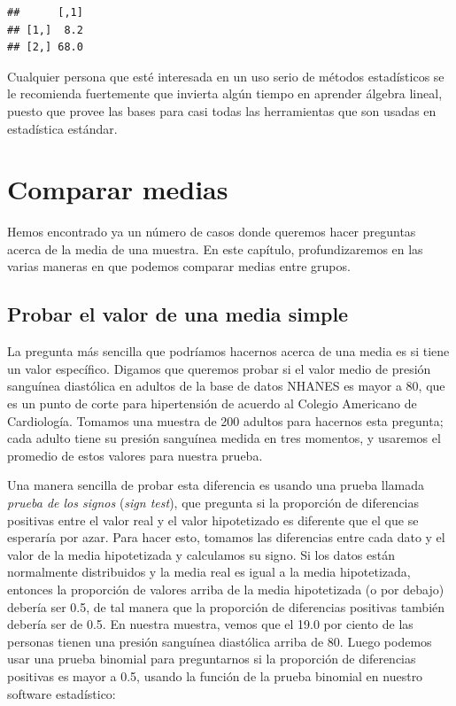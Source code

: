 \documentclass[
  12pt,
]{book}
\begin{document}
\begin{verbatim}
##      [,1]
## [1,]  8.2
## [2,] 68.0
\end{verbatim}

Cualquier persona que esté interesada en un uso serio de métodos estadísticos se le recomienda fuertemente que invierta algún tiempo en aprender álgebra lineal, puesto que provee las bases para casi todas las herramientas que son usadas en estadística estándar.

\hypertarget{comparing-means}{%
\chapter{Comparar medias}\label{comparing-means}}

Hemos encontrado ya un número de casos donde queremos hacer preguntas acerca de la media de una muestra. En este capítulo, profundizaremos en las varias maneras en que podemos comparar medias entre grupos.

\hypertarget{single-mean}{%
\section{Probar el valor de una media simple}\label{single-mean}}

La pregunta más sencilla que podríamos hacernos acerca de una media es si tiene un valor específico. Digamos que queremos probar si el valor medio de presión sanguínea diastólica en adultos de la base de datos NHANES es mayor a 80, que es un punto de corte para hipertensión de acuerdo al Colegio Americano de Cardiología. Tomamos una muestra de 200 adultos para hacernos esta pregunta; cada adulto tiene su presión sanguínea medida en tres momentos, y usaremos el promedio de estos valores para nuestra prueba.

Una manera sencilla de probar esta diferencia es usando una prueba llamada \emph{prueba de los signos} (\emph{sign test}), que pregunta si la proporción de diferencias positivas entre el valor real y el valor hipotetizado es diferente que el que se esperaría por azar. Para hacer esto, tomamos las diferencias entre cada dato y el valor de la media hipotetizada y calculamos su signo. Si los datos están normalmente distribuidos y la media real es igual a la media hipotetizada, entonces la proporción de valores arriba de la media hipotetizada (o por debajo) debería ser 0.5, de tal manera que la proporción de diferencias positivas también debería ser de 0.5. En nuestra muestra, vemos que el 19.0 por ciento de las personas tienen una presión sanguínea diastólica arriba de 80. Luego podemos usar una prueba binomial para preguntarnos si la proporción de diferencias positivas es mayor a 0.5, usando la función de la prueba binomial en nuestro software estadístico:
\end{document}
